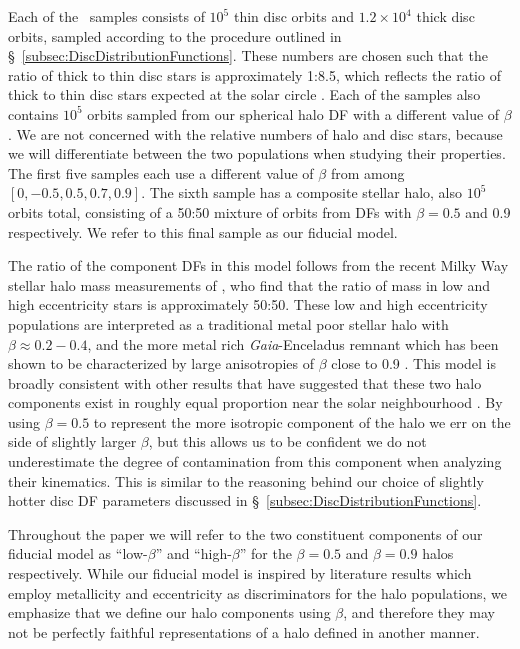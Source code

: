 Each of the \solar\ samples consists of $10^{5}$ thin disc orbits and $1.2\times10^{4}$ thick disc orbits, sampled according to the procedure outlined in \S~\ref{subsec:DiscDistributionFunctions}. These numbers are chosen such that the ratio of thick to thin disc stars is approximately 1:8.5, which reflects the ratio of thick to thin disc stars expected at the solar circle \citep[e.g. see the potential of][]{mcmillan17}. Each of the samples also contains $10^{5}$ orbits sampled from our spherical halo DF with a different value of $\beta$. We are not concerned with the relative numbers of halo and disc stars, because we will differentiate between the two populations when studying their properties. The first five samples each use a different value of $\beta$ from among $[0,-0.5,0.5,0.7,0.9]$. The sixth sample has a composite stellar halo, also $10^{5}$ orbits total, consisting of a 50:50 mixture of orbits from DFs with $\beta=0.5$ and 0.9 respectively. We refer to this final sample as our fiducial model. 

The ratio of the component DFs in this model follows from the recent Milky Way stellar halo mass measurements of \citet{mackereth20}, who find that the ratio of mass in low and high eccentricity stars is approximately 50:50. These low and high eccentricity populations are interpreted as a traditional metal poor stellar halo with $\beta \approx 0.2-0.4$, and the more metal rich \textit{Gaia}-Enceladus remnant which has been shown to be characterized by large anisotropies of $\beta$ close to 0.9 \citep{belokurov18,fattahi19,iorio21}. This model is broadly consistent with other results that have suggested that these two halo components exist in roughly equal proportion near the solar neighbourhood \citep{belokurov18,lancaster19,iorio21}. By using $\beta=0.5$ to represent the more isotropic component of the halo we err on the side of slightly larger $\beta$, but this allows us to be confident we do not underestimate the degree of contamination from this component when analyzing their kinematics. This is similar to the reasoning behind our choice of slightly hotter disc DF parameters discussed in \S~\ref{subsec:DiscDistributionFunctions}.

Throughout the paper we will refer to the two constituent components of our fiducial model as ``low-$\beta$'' and ``high-$\beta$'' for the $\beta=0.5$ and $\beta=0.9$ halos respectively. While our fiducial model is inspired by literature results which employ metallicity and eccentricity as discriminators for the halo populations, we emphasize that we define our halo components using $\beta$, and therefore they may not be perfectly faithful representations of a halo defined in another manner. 

